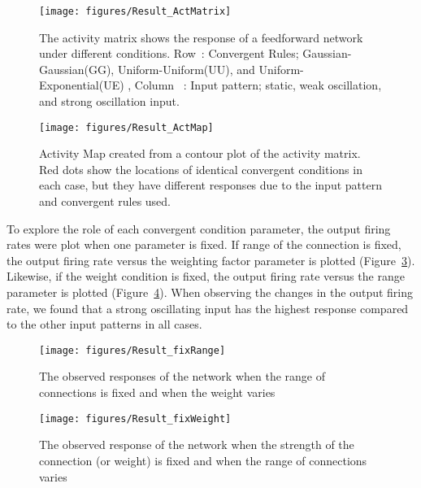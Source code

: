 \begin{figure}[!h]
	\centering
	\texttt{[image: figures/Result\_ActMatrix]}
	\caption{The activity matrix shows the response of a feedforward network under different conditions. Row~: Convergent Rules; Gaussian-Gaussian(GG), Uniform-Uniform(UU), and Uniform-Exponential(UE) , Column ~: Input pattern; static, weak oscillation, and strong oscillation input.}
	\label{fig:ActivityMatrix}
\end{figure}

\begin{figure}[!h]
	\centering
	\texttt{[image: figures/Result\_ActMap]}
	\caption{Activity Map created from a contour plot of the activity matrix. Red dots show the locations of identical convergent conditions in each case, but they have different responses due to the input pattern and convergent rules used.}
	\label{fig:ActivityMap}
\end{figure}


 To explore the role of each convergent condition parameter, the output firing rates were plot when one parameter is fixed. If range of the connection is fixed, the output  firing rate versus the weighting factor parameter is plotted (Figure~\ref{fig:ObservedRfix}). Likewise, if the weight condition is fixed, the output  firing rate versus the range  parameter is plotted (Figure~\ref{fig:ObservedWfix}). 
When observing the changes in the output firing rate, we found that a strong oscillating input has the highest response compared to the other input patterns in all cases.  


\begin{figure}[!h]
	\centering
	\texttt{[image: figures/Result\_fixRange]}
	\caption{The observed responses of the network when the range of connections is fixed and when the weight varies}
	\label{fig:ObservedRfix}
\end{figure}

\begin{figure}[!h]
	\centering
	\texttt{[image: figures/Result\_fixWeight]}
	\caption{The observed response of the network when the strength of the connection (or weight) is fixed and when the range of connections varies}
	\label{fig:ObservedWfix}
\end{figure}


